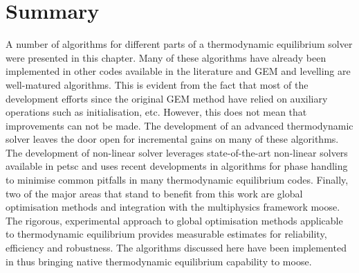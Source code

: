 \section{Summary}
	A number of algorithms for different parts of a thermodynamic equilibrium solver were presented in this chapter. Many of these algorithms have already been implemented in other codes available in the literature and GEM and levelling are well-matured algorithms. This is evident from the fact that most of the development efforts since the original GEM method have relied on auxiliary operations such as initialisation, etc. However, this does not mean that improvements can not be made.  The development of an advanced thermodynamic solver leaves the door open for incremental gains on many of these algorithms. The development of non-linear solver leverages state-of-the-art non-linear solvers available in \gls{petsc} and uses recent developments in algorithms for phase handling to minimise common pitfalls in many thermodynamic equilibrium codes. Finally, two of the major areas that stand to benefit from this work are global optimisation methods and integration with the multiphysics framework {\gls{moose}}. The rigorous, experimental approach to global optimisation methods applicable to thermodynamic equilibrium provides measurable estimates for reliability, efficiency and robustness. The algorithms discussed here have been implemented in {\GEM} thus bringing native thermodynamic equilibrium capability to \gls{moose}.
